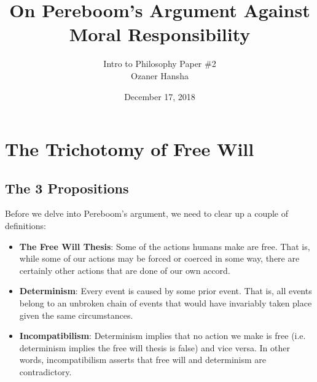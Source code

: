 \documentclass{article}
\begin{document}
\title{%
  On Pereboom's Argument Against \\\vspace*{-3mm} Moral Responsibility}
\author{Intro to Philosophy Paper \#2\\\vspace*{-2mm}Ozaner Hansha}
\date{December 17, 2018}
\maketitle


\section{The Trichotomy of Free Will}
\subsection{The 3 Propositions}
Before we delve into Pereboom's argument, we need to clear up a couple of definitions:
\begin{itemize}
  \item \textbf{The Free Will Thesis}: Some of the actions humans make are free. That is, while some of our actions may be forced or coerced in some way, there are certainly other actions that are done of our own accord.
  \item \textbf{Determinism}: Every event is caused by some prior event. That is, all events belong to an unbroken chain of events that would have invariably taken place given the same circumstances.
  \item \textbf{Incompatibilism}: Determinism implies that no action we make is free (i.e. determinism implies the free will thesis is false) and vice versa. In other words, incompatibilism asserts that free will and determinism are contradictory.
\end{itemize}
\end{document}
